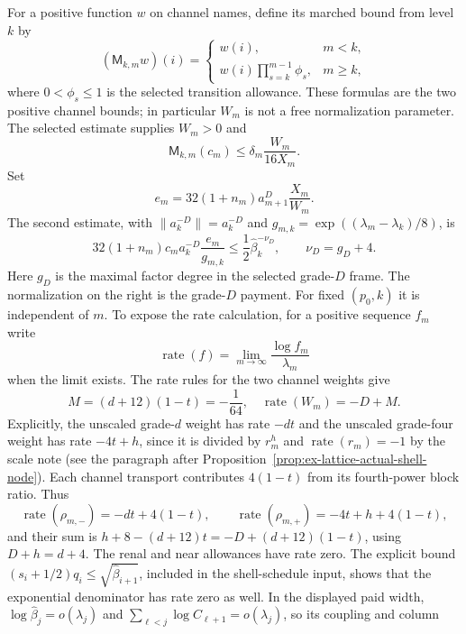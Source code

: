 For a positive function $w$ on channel names, define its marched bound
from level $k$ by
\[
 (\mathsf M_{k,m}w)(i)=
 \begin{cases}
 w(i),&m<k,\\
 w(i)\displaystyle\prod_{s=k}^{m-1}\phi_s,&m\ge k,
 \end{cases}
\]
where $0<\phi_s\le1$ is the selected transition allowance. These formulas
are the two positive channel bounds; in particular $W_m$ is not a free
normalization parameter.
The selected estimate supplies $W_m>0$ and
\begin{equation}\label{eq:ex-lattice-shell-march}
 \mathsf M_{k,m}(c_m)\le \delta_m\frac{W_m}{16X_m}.
\end{equation}
Set
\begin{equation}\label{eq:ex-lattice-shell-coefficient-budget}
 e_m=32(1+n_m)a_{m+1}^{D}\frac{X_m}{W_m}.
\end{equation}
The second estimate, with
$\|a_k^{-D}\|=a_k^{-D}$ and
$g_{m,k}=\exp((\lambda_m-\lambda_k)/8)$, is
\begin{equation}\label{eq:ex-lattice-shell-correction-price}
 32(1+n_m)c_m a_k^{-D}\frac{e_m}{g_{m,k}}
       \le \frac12\widehat\beta_k^{-\nu_D},
 \qquad \nu_D=g_D+4.
\end{equation}
Here $g_D$ is the maximal factor degree in the selected grade-$D$ frame. The
normalization on the right is the grade-$D$ payment. For fixed
$(p_0,k)$ it is independent of $m$.
To expose the rate calculation, for a positive sequence $f_m$ write
\[
 \operatorname{rate}(f)=\lim_{m\to\infty}\frac{\log f_m}{\lambda_m}
\]
when the limit exists. The rate rules for the two channel weights give
\[
 M=(d+12)(1-t)=-\frac1{64},\quad
 \operatorname{rate}(W_m)=-D+M.
\]
Explicitly, the unscaled grade-$d$ weight has rate $-dt$ and the unscaled
grade-four weight has rate $-4t+h$, since it is divided by $r_m^h$ and
$\operatorname{rate}(r_m)=-1$ by the scale note (see the paragraph after
Proposition~\ref{prop:ex-lattice-actual-shell-node}). Each channel transport contributes
$4(1-t)$ from its fourth-power block ratio. Thus
\[
 \operatorname{rate}(\rho_{m,-})=-dt+4(1-t),\qquad
 \operatorname{rate}(\rho_{m,+})=-4t+h+4(1-t),
\]
and their sum is $h+8-(d+12)t=-D+(d+12)(1-t)$, using
$D+h=d+4$. The renal and near allowances have rate zero. The explicit
bound $(s_i+1/2)q_i\leq\sqrt{\widehat\beta_{i+1}}$, included in the
shell-schedule input, shows that the
exponential denominator has rate zero as well. In the displayed paid width,
$\log\widehat\beta_j=o(\lambda_j)$ and
$\sum_{\ell<j}\log C_{\ell+1}=o(\lambda_j)$, so its coupling and column
